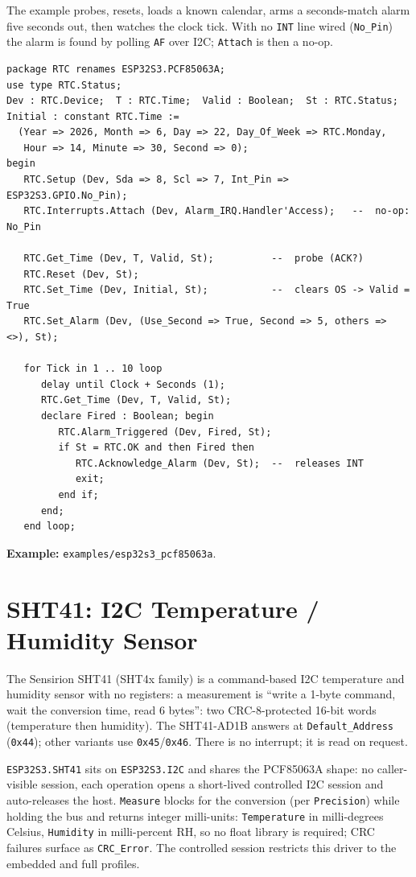 The example probes, resets, loads a known calendar, arms a seconds-match alarm five
seconds out, then watches the clock tick. With no \texttt{INT} line wired
(\texttt{No\_Pin}) the alarm is found by polling \texttt{AF} over I2C;
\texttt{Attach} is then a no-op.

\begin{lstlisting}
package RTC renames ESP32S3.PCF85063A;
use type RTC.Status;
Dev : RTC.Device;  T : RTC.Time;  Valid : Boolean;  St : RTC.Status;
Initial : constant RTC.Time :=
  (Year => 2026, Month => 6, Day => 22, Day_Of_Week => RTC.Monday,
   Hour => 14, Minute => 30, Second => 0);
begin
   RTC.Setup (Dev, Sda => 8, Scl => 7, Int_Pin => ESP32S3.GPIO.No_Pin);
   RTC.Interrupts.Attach (Dev, Alarm_IRQ.Handler'Access);   --  no-op: No_Pin

   RTC.Get_Time (Dev, T, Valid, St);          --  probe (ACK?)
   RTC.Reset (Dev, St);
   RTC.Set_Time (Dev, Initial, St);           --  clears OS -> Valid = True
   RTC.Set_Alarm (Dev, (Use_Second => True, Second => 5, others => <>), St);

   for Tick in 1 .. 10 loop
      delay until Clock + Seconds (1);
      RTC.Get_Time (Dev, T, Valid, St);
      declare Fired : Boolean; begin
         RTC.Alarm_Triggered (Dev, Fired, St);
         if St = RTC.OK and then Fired then
            RTC.Acknowledge_Alarm (Dev, St);  --  releases INT
            exit;
         end if;
      end;
   end loop;
\end{lstlisting}

\noindent\textbf{Example:} \texttt{examples/esp32s3\_pcf85063a}.

\section{SHT41: I2C Temperature / Humidity Sensor}
\label{app:ext:sht41}

The Sensirion SHT41 (SHT4x family) is a command-based I2C temperature and humidity
sensor with no registers: a measurement is ``write a 1-byte command, wait the
conversion time, read 6 bytes'': two CRC-8-protected 16-bit words (temperature
then humidity). The SHT41-AD1B answers at \texttt{Default\_Address} (\texttt{0x44});
other variants use \texttt{0x45}/\texttt{0x46}. There is no interrupt; it is read
on request.

\texttt{ESP32S3.SHT41} sits on \texttt{ESP32S3.I2C} and shares the PCF85063A shape:
no caller-visible session, each operation opens a short-lived controlled I2C
session and auto-releases the host. \texttt{Measure} blocks for the conversion (per
\texttt{Precision}) while holding the bus and returns integer milli-units:
\texttt{Temperature} in milli-degrees Celsius, \texttt{Humidity} in milli-percent
RH, so no float library is required; CRC failures surface as \texttt{CRC\_Error}.
The controlled session restricts this driver to the embedded and full profiles.

